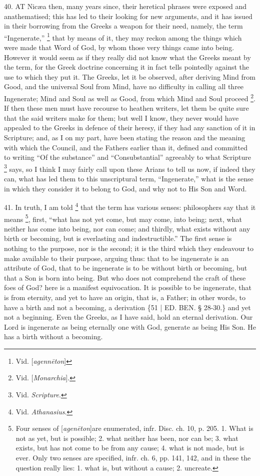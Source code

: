 40. AT
Nicæa then, many years since, their heretical phrases were exposed
and anathematised; this has led to their looking for new arguments,
and it has issued in their borrowing from the Greeks a weapon for
their need, namely, the term ``Ingenerate,'' \footnote{Vid. [\emph{agenn\={e}ton}]} that by means of it, they may reckon among the things which
were made that Word of God, by whom those very things came into being.
However it would seem as if they really did not know what the Greeks
meant by the term, for the Greek doctrine concerning it in fact tells
pointedly against the use to which they put it. The Greeks, let it be
observed, after deriving Mind from Good, and the universal Soul from
Mind, have no difficulty in calling all three Ingenerate; Mind and
Soul as well as Good, from which Mind and Soul proceed \footnote{Vid. [\emph{Monarchia}].}. If then these men must have recourse to heathen writers, let
them be quite sure that the said writers make for them; but well I
know, they never would have appealed to the Greeks in defence of their
heresy, if they had any sanction of it in Scripture; and, as I on my
part, have been stating the reason and the meaning with which the
Council, and the Fathers earlier than it, defined and committed to
writing ``Of the substance'' and ``Consubstantial'' agreeably to what
Scripture \footnote{Vid. \emph{Scripture}.} says, so I
think I may fairly call upon these Arians to tell us now, if indeed
they can, what has led them to this unscriptural term, ``Ingenerate,''
what is the sense in which they consider it to belong to God, and why
not to His Son and Word.

41. In truth, I am told \footnote{Vid. \emph{Athanasius}.} that the term has various senses: philosophers say that it
means \footnote{Four senses of [\emph{agen\={e}ton}]\emph{}are enumerated, infr.
Disc. ch. 10, p. 205. 1. What is not as yet, but is possible; 2. what
neither has been, nor can be; 3. what exists, but has not come to be
from any cause; 4. what is not made, but is ever. Only two senses are
specified, infr. ch. 6, pp. 141, 142, and in these the question really
lies: 1. what is, but without a cause; 2. uncreate.}, first, ``what
has not yet come, but may come, into being; next, what neither has
come into being, nor can come; and thirdly, what exists without any
birth or becoming, but is everlasting and indestructible.'' The first
sense is nothing to the purpose, nor is the second; it is the third
which they endeavour to make available to their purpose, arguing thus:
that to be ingenerate is an attribute of God, that to be ingenerate is
to be without birth or becoming, but that a Son is born into being.
But who does not comprehend the craft of these foes of God? here is a
manifest equivocation. It is possible to be ingenerate, that is from
eternity, and yet to have an origin, that is, a Father; in other
words, to have a birth and not a becoming, a derivation \{51 | ED.
BEN.
§ 28-30.\} and yet not a beginning. Even the Greeks, as I have said,
hold an eternal derivation. Our Lord is ingenerate as being eternally
one with God, generate as being His Son. He has a birth without a
becoming.

